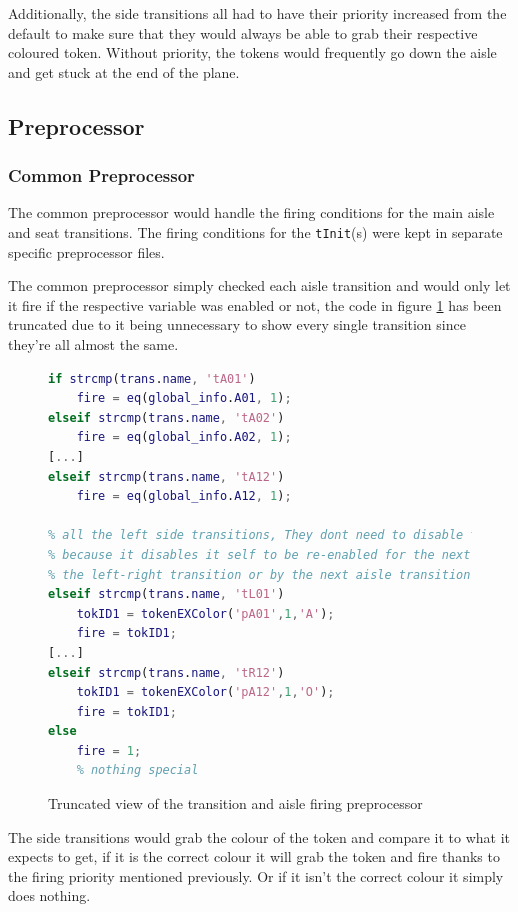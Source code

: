 \documentclass[english]{article}
\begin{document}
Additionally, the side transitions all had to have their priority increased from the default to make sure that they would always be able to grab their respective coloured token. Without priority, the tokens would frequently go down the aisle and get stuck at the end of the plane.

\subsection{Preprocessor}
\subsubsection{Common Preprocessor}
The common preprocessor would handle the firing conditions for the main aisle and seat transitions. The firing conditions for the \lstinline{tInit}(s) were kept in separate specific preprocessor files. 

The common preprocessor simply checked each aisle transition and would only let it fire if the respective variable was enabled or not, the code in figure \ref{fig:commonpre} has been truncated due to it being unnecessary to show every single transition since they're all almost the same.

\begin{figure}[H]
    \centering
\begin{lstlisting}[language=MATLAB]
if strcmp(trans.name, 'tA01')
    fire = eq(global_info.A01, 1);
elseif strcmp(trans.name, 'tA02')
    fire = eq(global_info.A02, 1);
[...]
elseif strcmp(trans.name, 'tA12')
    fire = eq(global_info.A12, 1);
    
% all the left side transitions, They dont need to disable the aisle
% because it disables it self to be re-enabled for the next token either by
% the left-right transition or by the next aisle transition
elseif strcmp(trans.name, 'tL01')
    tokID1 = tokenEXColor('pA01',1,'A');
    fire = tokID1;
[...]
elseif strcmp(trans.name, 'tR12')
    tokID1 = tokenEXColor('pA12',1,'O');
    fire = tokID1;
else
    fire = 1;
    % nothing special
\end{lstlisting}
    \caption{Truncated view of the transition and aisle firing preprocessor}
    \label{fig:commonpre}
\end{figure}

The side transitions would grab the colour of the token and compare it to what it expects to get, if it is the correct colour it will grab the token and fire thanks to the firing priority mentioned previously. Or if it isn't the correct colour it simply does nothing.
\end{document}
